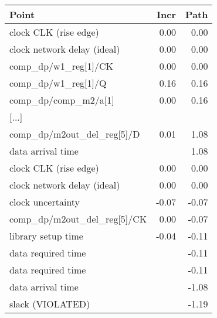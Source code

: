 \begin{tabular}[t]{|lrr|}  
	\hline
\textbf{Point}                                                  & \textbf{Incr}   &    \textbf{Path}\\\hline
  clock CLK (rise edge)                                  & 0.00   &    0.00\\
  clock network delay (ideal)                             &0.00   &    0.00\\
  comp\_dp/w1\_reg[1]/CK                         & 0.00   &    0.00\\
  comp\_dp/w1\_reg[1]/Q                             &0.16   &    0.16\\
  comp\_dp/comp\_m2/a[1]    &0.00   &    0.16\\
  {[...]} & &\\
  comp\_dp/m2out\_del\_reg[5]/D                    &0.01   &    1.08\\
  data arrival time                                      &     &       1.08\\
\hline
  clock CLK (rise edge)                                  & 0.00  &     0.00\\
  clock network delay (ideal)                           &  0.00   &    0.00\\
  clock uncertainty                                     & -0.07  &    -0.07\\
  comp\_dp/m2out\_del\_reg[5]/CK                 &   0.00   &   -0.07\\
  library setup time                                   &  -0.04   &   -0.11\\
  data required time                                   &            & -0.11\\
\hline
  data required time                                    & &            -0.11\\
  data arrival time                                     & &            -1.08\\
\hline
  slack (VIOLATED)                                         & &         -1.19\\\hline
\end{tabular}